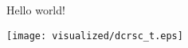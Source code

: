 \documentclass{article}
\begin{document}
    Hello world!

    \texttt{[image: visualized/dcrsc\_t.eps]}
\end{document}
